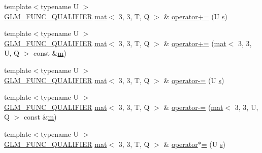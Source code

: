 \begin{DoxyCompactItemize}
{\footnotesize template$<$typename U $>$ }\\\mbox{\hyperlink{setup_8hpp_a33fdea6f91c5f834105f7415e2a64407}{G\+L\+M\+\_\+\+F\+U\+N\+C\+\_\+\+Q\+U\+A\+L\+I\+F\+I\+ER}} \mbox{\hyperlink{structglm_1_1mat}{mat}}$<$ 3, 3, T, Q $>$ \& \mbox{\hyperlink{structglm_1_1mat_3_013_00_013_00_01_t_00_01_q_01_4_a599b3db0f60dfda57462529ad4406ba8}{operator+=}} (U \mbox{\hyperlink{_s_d_l__opengl_8h_a4af680a6c683f88ed67b76f207f2e6e4}{s}})
\item 
{\footnotesize template$<$typename U $>$ }\\\mbox{\hyperlink{setup_8hpp_a33fdea6f91c5f834105f7415e2a64407}{G\+L\+M\+\_\+\+F\+U\+N\+C\+\_\+\+Q\+U\+A\+L\+I\+F\+I\+ER}} \mbox{\hyperlink{structglm_1_1mat}{mat}}$<$ 3, 3, T, Q $>$ \& \mbox{\hyperlink{structglm_1_1mat_3_013_00_013_00_01_t_00_01_q_01_4_abc45d059ceb749e219587c8d50e4ecbb}{operator+=}} (\mbox{\hyperlink{structglm_1_1mat}{mat}}$<$ 3, 3, U, Q $>$ const \&\mbox{\hyperlink{_s_d_l__opengl__glext_8h_af593500c283bf1a787a6f947f503a5c2}{m}})
\item 
{\footnotesize template$<$typename U $>$ }\\\mbox{\hyperlink{setup_8hpp_a33fdea6f91c5f834105f7415e2a64407}{G\+L\+M\+\_\+\+F\+U\+N\+C\+\_\+\+Q\+U\+A\+L\+I\+F\+I\+ER}} \mbox{\hyperlink{structglm_1_1mat}{mat}}$<$ 3, 3, T, Q $>$ \& \mbox{\hyperlink{structglm_1_1mat_3_013_00_013_00_01_t_00_01_q_01_4_acd25696de3d8abb588896e405fa0e314}{operator-\/=}} (U \mbox{\hyperlink{_s_d_l__opengl_8h_a4af680a6c683f88ed67b76f207f2e6e4}{s}})
\item 
{\footnotesize template$<$typename U $>$ }\\\mbox{\hyperlink{setup_8hpp_a33fdea6f91c5f834105f7415e2a64407}{G\+L\+M\+\_\+\+F\+U\+N\+C\+\_\+\+Q\+U\+A\+L\+I\+F\+I\+ER}} \mbox{\hyperlink{structglm_1_1mat}{mat}}$<$ 3, 3, T, Q $>$ \& \mbox{\hyperlink{structglm_1_1mat_3_013_00_013_00_01_t_00_01_q_01_4_ab89e6f23520371a3c2294d906ec59d07}{operator-\/=}} (\mbox{\hyperlink{structglm_1_1mat}{mat}}$<$ 3, 3, U, Q $>$ const \&\mbox{\hyperlink{_s_d_l__opengl__glext_8h_af593500c283bf1a787a6f947f503a5c2}{m}})
\item 
{\footnotesize template$<$typename U $>$ }\\\mbox{\hyperlink{setup_8hpp_a33fdea6f91c5f834105f7415e2a64407}{G\+L\+M\+\_\+\+F\+U\+N\+C\+\_\+\+Q\+U\+A\+L\+I\+F\+I\+ER}} \mbox{\hyperlink{structglm_1_1mat}{mat}}$<$ 3, 3, T, Q $>$ \& \mbox{\hyperlink{structglm_1_1mat_3_013_00_013_00_01_t_00_01_q_01_4_a17980b36cc9b56a4826a855a21ca4229}{operator$\ast$=}} (U \mbox{\hyperlink{_s_d_l__opengl_8h_a4af680a6c683f88ed67b76f207f2e6e4}{s}})

\end{DoxyCompactItemize}
